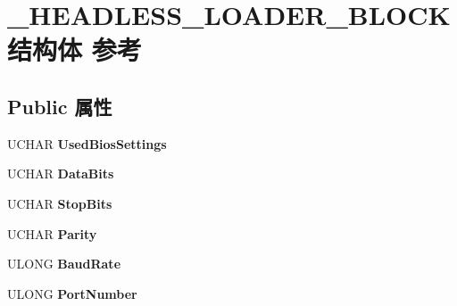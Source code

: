 \hypertarget{struct___h_e_a_d_l_e_s_s___l_o_a_d_e_r___b_l_o_c_k}{}\section{\+\_\+\+H\+E\+A\+D\+L\+E\+S\+S\+\_\+\+L\+O\+A\+D\+E\+R\+\_\+\+B\+L\+O\+C\+K结构体 参考}
\label{struct___h_e_a_d_l_e_s_s___l_o_a_d_e_r___b_l_o_c_k}
\subsection*{Public 属性}
\begin{DoxyCompactItemize}
\item 
\mbox{\label{struct___h_e_a_d_l_e_s_s___l_o_a_d_e_r___b_l_o_c_k_a3b69b19f3f46ec3e878fe1d85008dd83}} 
U\+C\+H\+AR {\bfseries Used\+Bios\+Settings}
\item 
\mbox{\label{struct___h_e_a_d_l_e_s_s___l_o_a_d_e_r___b_l_o_c_k_a77106fa0a2e1348f84654cefe9e1fac8}} 
U\+C\+H\+AR {\bfseries Data\+Bits}
\item 
\mbox{\label{struct___h_e_a_d_l_e_s_s___l_o_a_d_e_r___b_l_o_c_k_af5798b65b0d56c87d70d4de171019205}} 
U\+C\+H\+AR {\bfseries Stop\+Bits}
\item 
\mbox{\label{struct___h_e_a_d_l_e_s_s___l_o_a_d_e_r___b_l_o_c_k_ab53002c383a54b08ee308125cd70c3b1}} 
U\+C\+H\+AR {\bfseries Parity}
\item 
\mbox{\label{struct___h_e_a_d_l_e_s_s___l_o_a_d_e_r___b_l_o_c_k_a680245fde22fef51ed8203dfa2f2da78}} 
U\+L\+O\+NG {\bfseries Baud\+Rate}
\item 
\mbox{\label{struct___h_e_a_d_l_e_s_s___l_o_a_d_e_r___b_l_o_c_k_a2eb99f0774aed5c6b4c17b15aa7780fb}} 
U\+L\+O\+NG {\bfseries Port\+Number}
\item 
\mbox{\label{struct___h_e_a_d_l_e_s_s___l_o_a_d_e_r___b_l_o_c_k_a54a903e00238871f3fef944dac3603dc}} 

\end{DoxyCompactItemize}
